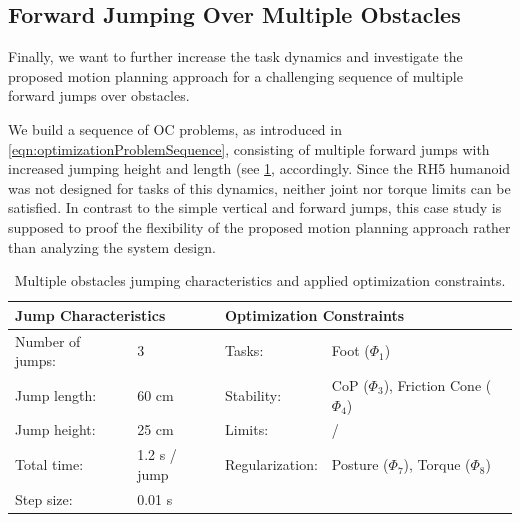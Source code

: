 \subsection{Forward Jumping Over Multiple Obstacles}
Finally, we want to further increase the task dynamics and investigate the proposed motion planning approach for a challenging sequence of multiple forward jumps over obstacles. 

We build a sequence of \gls{OC} problems, as introduced in \cref{eqn:optimizationProblemSequence}, consisting of multiple forward jumps with increased jumping height and length (see \cref{tab:jumpObstacles}, accordingly. Since the RH5 humanoid was not designed for tasks of this dynamics, neither joint nor torque limits can be satisfied. In contrast to the simple vertical and forward jumps, this case study is supposed to proof the flexibility of the proposed motion planning approach rather than analyzing the system design. 

\begin{table}[t]
\centering
\caption{Multiple obstacles jumping characteristics and applied optimization constraints.}
\begin{tabular}{|ll|ll|}
\hline
\multicolumn{2}{|l|}{\textbf{Jump Characteristics}} & \multicolumn{2}{l|}{\textbf{Optimization Constraints}} \\ \hline
Number of jumps: & 3 	& Tasks: 			& Foot ($\Phi_1$) \\ \hline
Jump length:& 60 cm 	& Stability: 		& \gls{CoP} ($\Phi_3$), Friction Cone ($\Phi_4$)\\ \hline
Jump height:& 25 cm  	& Limits:   & / \\ \hline
Total time:& 1.2 s / jump  & Regularization: 	& Posture ($\Phi_7$), Torque ($\Phi_8$)\\ \hline
Step size:& 0.01 s & & \\ \hline
\end{tabular}
\label{tab:jumpObstacles}
\end{table}

